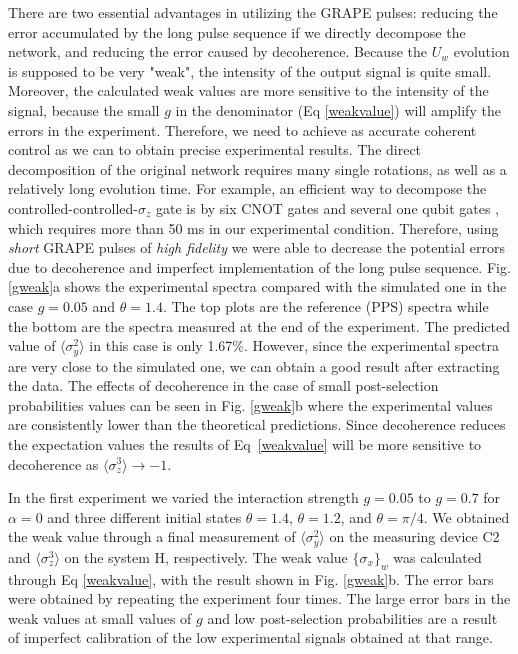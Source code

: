 \documentclass[aps,pra,12pt,onecolumn,showpacs,superscriptaddress,floatfix,footinbib,subfigure]{revtex4}
\begin{document}
There are two essential advantages in utilizing the GRAPE pulses: reducing the error accumulated by the long pulse sequence if we directly decompose the network, and reducing the error caused by  decoherence. Because the $U_w$ evolution is supposed to be very "weak", the intensity of the output signal is quite small. Moreover, the calculated weak values are more sensitive to the intensity of the signal, because the small $g$  in the denominator (Eq \ref{weakvalue}) will amplify the errors in the experiment. Therefore, we need to achieve as accurate coherent control as we can to obtain precise experimental results. The direct decomposition of the original network requires many single rotations, as well as a relatively long evolution time. For example, an efficient way to decompose the controlled-controlled-$\sigma_z$ gate is by six CNOT gates and several one qubit gates \cite{NielsenandChuang}, which requires more than 50 ms in our experimental condition. Therefore, using \emph{short} GRAPE pulses of \emph{high fidelity} we were able to decrease the potential errors  due to decoherence and imperfect implementation of the long pulse sequence.  Fig. \ref{gweak}a shows  the experimental spectra compared with the simulated one in the case $g=0.05$ and $\theta = 1.4$. The top plots are the reference (PPS) spectra while the bottom are the spectra measured at the end of the experiment. The predicted value of $\langle \sigma_y^2 \rangle$ in this case is only 1.67\%. However, since the experimental spectra are very close to the simulated one, we can obtain a good result after extracting the data. The effects of decoherence in the case of small post-selection probabilities values can be seen in Fig. \ref{gweak}b where the experimental values  are consistently lower than the theoretical predictions. Since decoherence reduces the expectation values the results of   Eq~\eqref{weakvalue} will be more sensitive to decoherence as $\langle\sigma_z^3\rangle\rightarrow - 1$.

In the first experiment we varied the interaction strength   $g=0.05$ to $g = 0.7$ for $\alpha=0$ and three different initial states $\theta = 1.4$, $\theta = 1.2$, and $\theta =\pi/4$. We obtained the weak value through a final measurement of  $\langle \sigma_y^2 \rangle$ on the measuring device C2 and $\langle \sigma_z^3 \rangle$ on the system H, respectively. The weak value $\{ \sigma_x \}_w$  was calculated through Eq \eqref{weakvalue}, with the result shown in Fig. \ref{gweak}b. The error bars were  obtained by repeating the experiment  four times. The large error bars in the weak values at small values of  $g$ and low post-selection probabilities  are a result of imperfect calibration of the low experimental signals obtained at that range.
\end{document}
